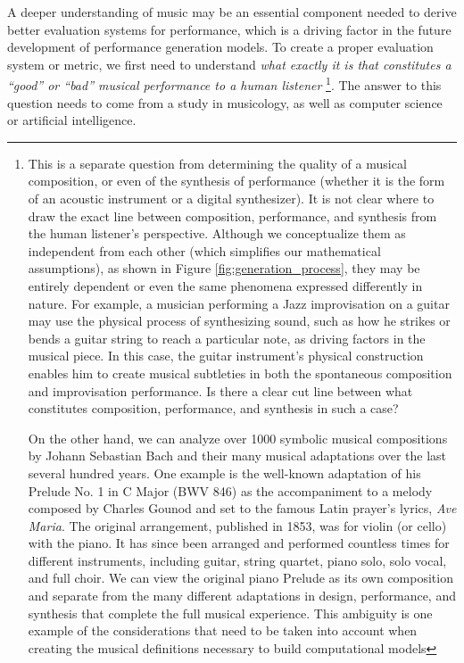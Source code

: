 A deeper understanding of music may be an essential component needed to derive better evaluation systems for performance, which is a driving factor in the future development of performance generation models. To create a proper evaluation system or metric, we first need to understand \emph{what exactly it is that constitutes a ``good'' or ``bad'' musical performance to a human listener}%
\footnote{This is a separate question from determining the quality of a musical composition, or even of the synthesis of performance (whether it is the form of an acoustic instrument or a digital synthesizer). It is not clear where to draw the exact line between composition, performance, and synthesis from the human listener's perspective. Although we conceptualize them as independent from each other (which simplifies our mathematical assumptions), as shown in Figure \ref{fig:generation_process}, they may be entirely dependent or even the same phenomena expressed differently in nature. For example, a musician performing a Jazz improvisation on a guitar may use the physical process of synthesizing sound, such as how he strikes or bends a guitar string to reach a particular note, as driving factors in the musical piece. In this case, the guitar instrument's physical construction enables him to create musical subtleties in both the spontaneous composition and improvisation performance. Is there a clear cut line between what constitutes composition, performance, and synthesis in such a case?

On the other hand, we can analyze over 1000 symbolic musical compositions by Johann Sebastian Bach and their many musical adaptations over the last several hundred years. One example is the well-known adaptation of his Prelude No. 1 in C Major (BWV 846) as the accompaniment to a melody composed by Charles Gounod and set to the famous Latin prayer's lyrics, \emph{Ave Maria}. The original arrangement, published in 1853, was for violin (or cello) with the piano. It has since been arranged and performed countless times for different instruments, including guitar, string quartet, piano solo, solo vocal, and full choir. We can view the original piano Prelude as its own composition and separate from the many different adaptations in design, performance, and synthesis that complete the full musical experience. This ambiguity is one example of the considerations that need to be taken into account when creating the musical definitions necessary to build computational models}. The answer to this question needs to come from a study in musicology, as well as computer science or artificial intelligence. 

